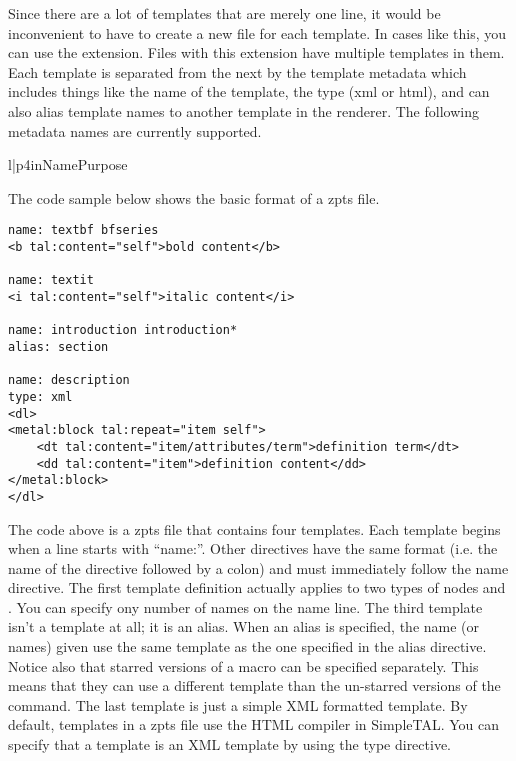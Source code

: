 Since there are a lot of templates that are merely one line, it would be
inconvenient to have to create a new file for each template.  In cases
like this, you can use the  extension.  Files with this
extension have multiple templates in them.  Each template is separated
from the next by the template metadata which includes things like the 
name of the template, the type (xml or html), and can also alias 
template names to another template in the renderer.  The following 
metadata names are currently supported.
\begin{tableii}{l|p{4in}}{}{Name}{Purpose}
\end{tableii}

The code sample below shows the basic format of a zpts file.
\begin{verbatim}
name: textbf bfseries
<b tal:content="self">bold content</b>

name: textit
<i tal:content="self">italic content</i>

name: introduction introduction*
alias: section

name: description
type: xml
<dl>
<metal:block tal:repeat="item self">
    <dt tal:content="item/attributes/term">definition term</dt>
    <dd tal:content="item">definition content</dd>
</metal:block>
</dl>
\end{verbatim}

The code above is a zpts file that contains four templates.  Each template
begins when a line starts with ``name:''.  Other directives have the same
format (i.e. the name of the directive followed by a colon) and must 
immediately follow the name directive.  The first template definition 
actually applies to two types of nodes  and .
You can specify ony number of names on the name line.  The third template
isn't a template at all; it is an alias.  When an alias is specified,
the name (or names) given use the same template as the one specified 
in the alias directive.  Notice also that starred versions of a macro
can be specified separately.  This means that they can use a different
template than the un-starred versions of the command.
The last template is just a simple XML formatted
template.  By default, templates in a zpts file use the HTML compiler
in SimpleTAL.  You can specify that a template is an XML template by using
the type directive.


